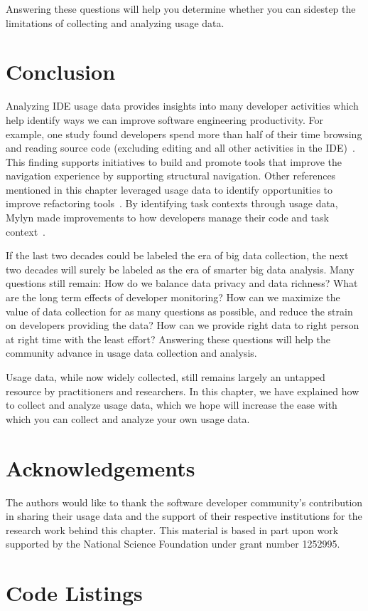 \documentclass{book}
\begin{document}
\noindent
Answering these questions will help you determine whether you can sidestep
the limitations of collecting and analyzing usage data.

\section{Conclusion}

Analyzing IDE usage data provides insights into many developer activities which help identify ways we can improve software engineering productivity.  For example, one study found developers spend more than half of their time browsing and reading source code (excluding editing and all other activities in the IDE)~\cite{SnipesExperiencesGamifyingSoftwareDevelopment}.  This finding supports initiatives to build and promote tools that improve the navigation experience by supporting structural navigation.  Other references mentioned in this chapter leveraged usage data to identify opportunities to improve refactoring tools~\cite{VakilianJohnson2014Alternate,MurphyHill2012Improving}.  By identifying task contexts through usage data, Mylyn made improvements to how developers manage their code and task context~\cite{Kersten-Mylyn}.  

If the last two decades could be labeled the era
of big data collection,
the next two decades will surely be labeled as the
era of smarter big data analysis.
Many questions still remain:
How do we balance data privacy and data richness?
What are the long term effects of developer monitoring?
How can we maximize the value of data collection
for as many questions as possible, and reduce the
strain on developers providing the data? How can we provide right data to right person at right time with the least effort?
Answering these questions will help the
community advance in usage data collection and analysis.

Usage data, while now widely collected, still remains largely
an untapped resource by practitioners and researchers.
In this chapter, we have explained how to collect and
analyze usage data, which we hope will increase the ease
with which you can collect and analyze your own usage data.


\section{Acknowledgements}

The authors would like to thank the software developer community's contribution in sharing their usage data and the support of their respective institutions for the research work behind this chapter.  This material is based in part upon work supported by the National 
Science Foundation under grant number 1252995.

\section{Code Listings}



 
\end{document}
